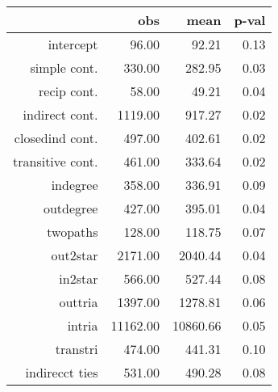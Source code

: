 \begin{table}[ht]
\centering
\begin{tabular}{rrrr}
  \hline
 & obs & mean & p-val \\ 
  \hline
intercept & 96.00 & 92.21 & 0.13 \\ 
  simple cont. & 330.00 & 282.95 & 0.03 \\ 
  recip cont. & 58.00 & 49.21 & 0.04 \\ 
  indirect cont. & 1119.00 & 917.27 & 0.02 \\ 
  closedind cont. & 497.00 & 402.61 & 0.02 \\ 
  transitive cont. & 461.00 & 333.64 & 0.02 \\ 
  indegree & 358.00 & 336.91 & 0.09 \\ 
  outdegree & 427.00 & 395.01 & 0.04 \\ 
  twopaths & 128.00 & 118.75 & 0.07 \\ 
  out2star & 2171.00 & 2040.44 & 0.04 \\ 
  in2star & 566.00 & 527.44 & 0.08 \\ 
  outtria & 1397.00 & 1278.81 & 0.06 \\ 
  intria & 11162.00 & 10860.66 & 0.05 \\ 
  transtri & 474.00 & 441.31 & 0.10 \\ 
  indirecct ties & 531.00 & 490.28 & 0.08 \\ 
   \hline
\end{tabular}
\end{table}
